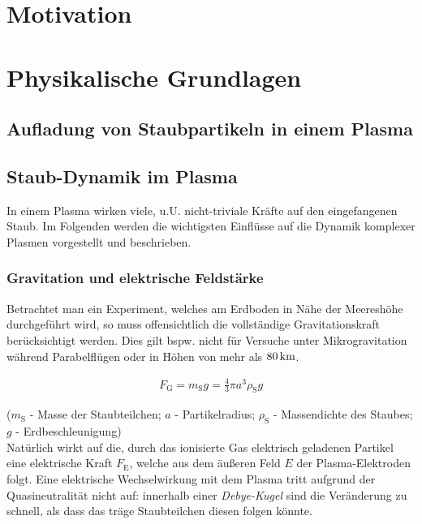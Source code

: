 \documentclass[numbers=noenddot,a4paper]{scrartcl}
\newcommand{\ix}[1]{_\text{#1}}
\newcommand{\tilt}[1]{\textit{#1}}
\begin{document}
	\thispagestyle{empty}
	
	\newpage
	
	\tableofcontents
	
	\newpage
	
	\section{Motivation}\label{sec:einleitung}
	
	\newpage
	
	\section{Physikalische Grundlagen}\label{sec:physg}
	
		\subsection{Aufladung von Staubpartikeln in einem Plasma}\label{subsec:ströme}
	
		\subsection{Staub-Dynamik im Plasma}\label{subsec:dynamik}
		
				In einem Plasma wirken viele, u.U. nicht-triviale Kräfte auf den eingefangenen Staub. Im Folgenden werden die wichtigsten Einflüsse auf die Dynamik komplexer Plasmen vorgestellt und beschrieben.\\
				
				\subsubsection{Gravitation und elektrische Feldstärke}\label{subsub:grav}
				
				Betrachtet man ein Experiment, welches am Erdboden in Nähe der Meereshöhe durchgeführt wird, so muss offensichtlich die vollständige Gravitationskraft berücksichtigt werden. Dies gilt bspw. nicht für Versuche unter Mikrogravitation während Parabelflügen oder in Höhen von mehr als $\unit[80]{km}$.
				
					\begin{align}
						F\ix{G}=m\ix{S} g=\frac{4}{3}\pi a^3 \rho\ix{S} g
					\end{align}
				
				($m\ix{S}$ - Masse der Staubteilchen; $a$ - Partikelradius; $\rho\ix{S}$ - Massendichte des Staubes; $g$ - \mbox{Erdbeschleunigung})\\
				Natürlich wirkt auf die, durch das ionisierte Gas elektrisch geladenen Partikel eine elektrische Kraft $F\ix{E}$, welche aus dem äußeren Feld $E$ der Plasma-Elektroden folgt. Eine elektrische Wechselwirkung mit dem Plasma tritt aufgrund der Quasineutralität nicht auf: innerhalb einer \tilt{Debye-Kugel} sind die Veränderung zu schnell, als dass das träge Staubteilchen diesen folgen könnte. 
				
\end{document}
